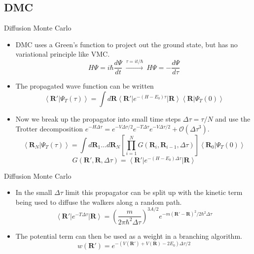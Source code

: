 \documentclass{beamer}
\newcommand{\ket}[1]{\left| #1 \right>}
\newcommand{\bra}[1]{\left< #1 \right|}
\newcommand{\braket}[2]{\left< #1 | #2 \right>}
\newcommand{\R}{\mathbf{R}}
\newcommand{\dt}{\Delta\tau}
\begin{document}
\subsection{DMC}
\begin{frame}{Diffusion Monte Carlo}
\begin{itemize}
   \item DMC uses a Green's function to project out the ground state, but has no variational principle like VMC.
   \begin{equation*}
      H\Psi = i\hbar\frac{d\Psi}{dt} ~ \xrightarrow{\tau=it/\hbar} ~ H\Psi = -\frac{d\Psi}{d\tau}
   \end{equation*}
   \item The propagated wave function can be written
   \begin{equation*}
      \braket{\R'}{\Psi_T(\tau)} = \int d\R \bra{\R'}e^{-(H-E_0)\tau}\ket{\R}\braket{\R}{\Psi_T(0)}
   \end{equation*}
   \item Now we break up the propagator into small time steps $\dt = \tau/N$ and use the Trotter decomposition $e^{-H\Delta\tau}=e^{-V\Delta\tau/2}e^{-T\Delta\tau}e^{-V\Delta\tau/2}+\mathcal{O}(\Delta\tau^3)$.
   \begin{equation*}
      \braket{\R_N}{\Psi_T(\tau)} = \int d\R_1 \ldots d\R_N \left[\prod\limits_{i=1}^N G(\R_i,\R_{i-1},\Delta\tau)\right] \braket{\R_0}{\Psi_T(0)}
   \end{equation*}
   \begin{equation*}
      G(\R',\R,\Delta\tau) = \bra{\R'}e^{-(H-E_0)\Delta\tau}\ket{\R}
   \end{equation*}
\end{itemize}
\end{frame}

\begin{frame}{Diffusion Monte Carlo}
\begin{itemize}
   \item In the small $\dt$ limit this propagator can be split up with the kinetic term being used to diffuse the walkers along a random path.
   \begin{equation*}
      \bra{\R'}e^{-T\Delta \tau}\ket{\R} = \left(\frac{m}{2\pi\hbar^2\Delta\tau}\right)^{3A/2}e^{-m(\R'-\R)^2/2\hbar^2\Delta\tau}
   \end{equation*}
   \item The potential term can then be used as a weight in a branching algorithm.
   \begin{equation*}
      w(\R') = e^{-\left(V\left(\R'\right)+V\left(\R\right)-2E_0\right)\Delta\tau/2}%
   \end{equation*}
\end{itemize}
\end{frame}
\end{document}
